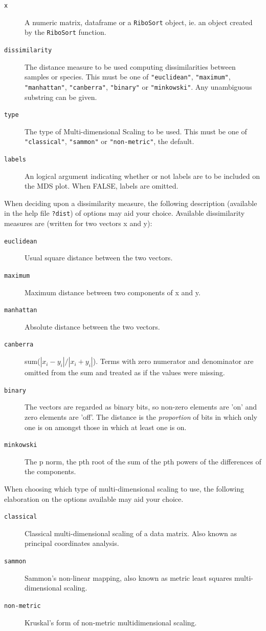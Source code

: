 \documentclass[a4paper]{article}
\begin{document}
\begin{description}
\item[\texttt{x}] A numeric matrix, dataframe or a \texttt{RiboSort} object, ie. an object created by the \texttt{RiboSort} function.
\item[\texttt{dissimilarity}] The distance measure to be used computing dissimilarities between samples or species. This must be one of \texttt{"euclidean"}, \texttt{"maximum"}, \texttt{"manhattan"}, \texttt{"canberra"}, \texttt{"binary"} or \texttt{"minkowski"}. Any unambiguous substring can be given.
\item[\texttt{type}] The type of Multi-dimensional Scaling to be used. This must be one of \texttt{"classical"}, \texttt{"sammon"} or \texttt{"non-metric"}, the default.
\item[\texttt{labels}] An logical argument indicating whether or not labels are to be included on the MDS plot. When FALSE, labels are omitted.
\end{description}
%
When deciding upon a dissimilarity measure, the following description (available in the help file \texttt{?dist}) of options may aid your choice. Available dissimilarity measures are (written for two vectors x and y):
%
\begin{description}
\item [\texttt{euclidean}] Usual square distance between the two vectors.
\item [\texttt{maximum}] Maximum distance between two components of x and y.
\item [\texttt{manhattan}] Absolute distance between the two vectors.
\item [\texttt{canberra}] sum($|x_{i} - y_{i}| / |x_{i} + y_{i}|$). Terms with zero numerator and denominator are omitted from the sum and treated as if the values were missing.
\item [\texttt{binary}] The vectors are regarded as binary bits, so non-zero elements are 'on' and zero elements are 'off'. The distance is the \textit{proportion} of bits in which only one is on amongst those in which at least one is on.
\item [\texttt{minkowski}] The p norm, the pth root of the sum of the pth powers of the differences of the components.
\end{description}
%
When choosing which type of multi-dimensional scaling to use, the following elaboration on the options available may aid your choice.
%
\begin{description}
\item [\texttt{classical}] Classical multi-dimensional scaling of a data matrix. Also known as principal coordinates analysis.
\item [\texttt{sammon}] Sammon's non-linear mapping, also known as metric least squares  multi-dimensional scaling.
\item [\texttt{non-metric}] Kruskal's form of non-metric multidimensional scaling.
\end{description}
\end{document}

